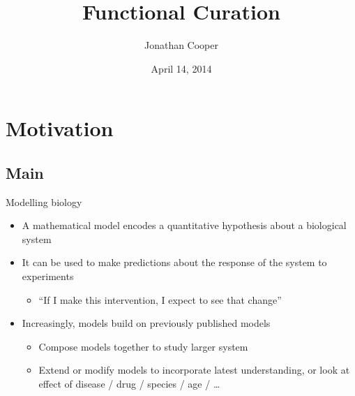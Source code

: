\documentclass[t,xcolor={usenames,dvipsnames}]{beamer}
\title{Functional Curation}
\author{Jonathan Cooper}
\institute[University of Oxford]
{Computational Biology Group\\
 Department of Computer Science\\
 University of Oxford}
\date{April 14, 2014}
\newcommand{\subitem}[1]{\begin{itemize}[<.->]\item #1 \end{itemize}}
\begin{document}
\begin{frame}
\titlepage
\end{frame}

\section{Motivation}
\subsection*{Main}

\begin{frame}{Modelling biology}
\begin{itemize}
\item A mathematical model encodes a quantitative hypothesis about a biological system
\item It can be used to make predictions about the response of the system to experiments
  \subitem{``If I make this intervention, I expect to see that change''}
\item Increasingly, models build on previously published models
  \begin{itemize}
  \item Compose models together to study larger system
  \item Extend or modify models to incorporate latest understanding, or look at effect of disease / drug / species / age / \ldots
  \end{itemize}
\end{itemize}
\end{frame}
\end{document}
